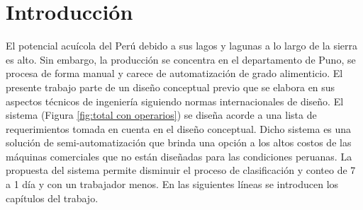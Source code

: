 
\newpage
\clearpage{\pagestyle{empty}\cleardoublepage}
\newpage

\pagestyle{myportland}

\chapter*{\centering \large Introducción} 

\thispagestyle{myportland}

 El potencial acuícola del Perú debido a sus lagos y lagunas a lo largo de la sierra es alto. Sin embargo, la producción se concentra en el departamento de Puno, se procesa de forma manual y carece de automatización de grado alimenticio. El presente trabajo parte de un diseño conceptual previo que se elabora en sus aspectos técnicos de ingeniería siguiendo normas internacionales de diseño. El sistema (Figura \ref{fig:total con operarios}) se diseña acorde a una lista de requerimientos tomada en cuenta en el diseño conceptual. Dicho sistema es una solución de semi-automatización que brinda una opción a los altos costos de las máquinas comerciales que no están diseñadas para las condiciones peruanas. La propuesta del sistema permite disminuir el proceso de clasificación y conteo de 7 a 1 día y con un trabajador menos. En las siguientes líneas se introducen los capítulos del trabajo.
 
